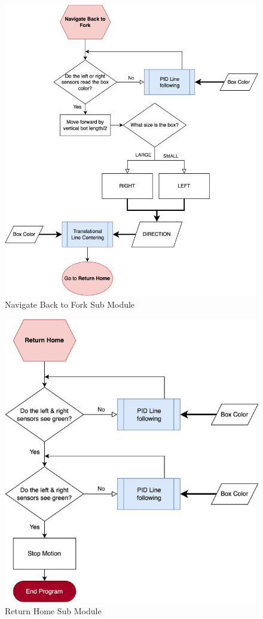 \documentclass[12pt]{report}
\begin{document}
\begin{figure}[H]
    \centering
    \includegraphics[width=1\textwidth]{Images/flowchart/navigate_back_to_fork.pdf}
    \caption{Navigate Back to Fork Sub Module}
    \label{fig:fc:navigate-back-to-fork}
\end{figure}

\begin{figure}[H]
    \centering
    \includegraphics[width=1\textwidth]{Images/flowchart/return_home.pdf}
    \caption{Return Home Sub Module}
    \label{fig:fc:return-home}
\end{figure}
\end{document}
